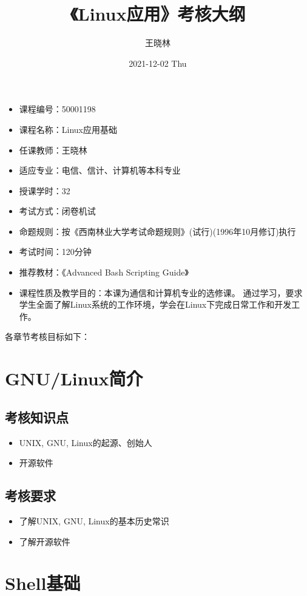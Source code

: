 \documentclass{wx672ctexart} \usepackage{wx672hyperref}
\author{王晓林}
\date{2021-12-02 Thu}
\title{《Linux应用》考核大纲}
\begin{document}
\maketitle
\tableofcontents

\clearpage

\begin{itemize}
\item 课程编号：50001198
\item 课程名称：Linux应用基础
\item 任课教师：王晓林
\item 适应专业：电信、信计、计算机等本科专业
\item 授课学时：32
\item 考试方式：闭卷机试
\item 命题规则：按《西南林业大学考试命题规则》(试行)(1996年10月修订)执行
\item 考试时间：120分钟
\item 推荐教材：《Advanced Bash Scripting Guide》
\item 课程性质及教学目的：本课为通信和计算机专业的选修课。 通过学习，要求学生全面了解Linux系统的工作环境，学会在Linux下完成日常工作和开发工作。
\end{itemize}

各章节考核目标如下：
\section{GNU/Linux简介}
\label{sec:org5b843dd}
\subsection{考核知识点}
\label{sec:org477c304}
\begin{itemize}
\item UNIX, GNU, Linux的起源、创始人
\item 开源软件
\end{itemize}
\subsection{考核要求}
\label{sec:org6feb019}
\begin{itemize}
\item 了解UNIX, GNU, Linux的基本历史常识
\item 了解开源软件
\end{itemize}
\section{Shell基础}
\label{sec:org765a270}
\end{document}
